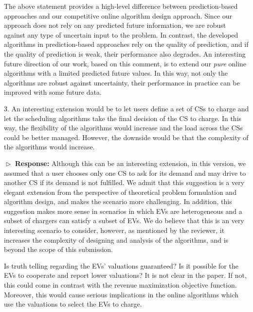 \documentclass[11pt]{article}
\begin{document}
The above statement provides a high-level difference between prediction-based approaches and our competitive online algorithm design approach. Since our approach does not rely on any predicted future information, we are robust against any type of uncertain input to the problem. In contrast, the developed algorithms in prediction-based approaches rely on the quality of prediction, and if the quality of prediction is weak, their performance also degrades. An interesting future direction of our work, based on this comment, is to extend our \textit{pure} online algorithms with a limited predicted future values. In this way, not only the algorithms are robust against uncertainty, their performance in practice can be improved with some future data. 

\vspace{3mm}
{\color{blue} 3. An interesting extension would be to let users define a set of CSs to charge and let the scheduling algorithms take the final decision of the CS to charge. In this way, the flexibility of the algorithms would increase and the load across the CSs could be better managed. However, the downside would be that the complexity of the algorithms would increase. }
\vspace{3mm}

$\vartriangleright$ \noindent\textbf{Response:} 
Although this can be an interesting extension, in this version, we assumed that a user chooses only one CS to ask for its demand and may drive to another CS if its demand is not fulfilled. We admit that this suggestion is a very elegant extension from the perspective of theoretical problem formulation and algorithm design, and makes the scenario more challenging. In addition, this suggestion makes more sense in scenarios in which EVs are heterogeneous and a subset of chargers can satisfy a subset of EVs. We do believe that this is an very interesting scenario to consider, however, as mentioned by the reviewer, it increases the complexity of designing and analysis of the algorithms, and is beyond the scope of this submission. 

\vspace{3mm}
{\color{blue} Is truth telling regarding the EVs’ valuations guaranteed? Is it possible for the EVs to cooperate and report lower valuations? It is not clear in the paper. If not, this could come in contrast with the revenue maximization objective function. Moreover, this would cause serious implications in the online algorithms which use the valuations to select the EVs to charge.}
\vspace{3mm}
\end{document}
